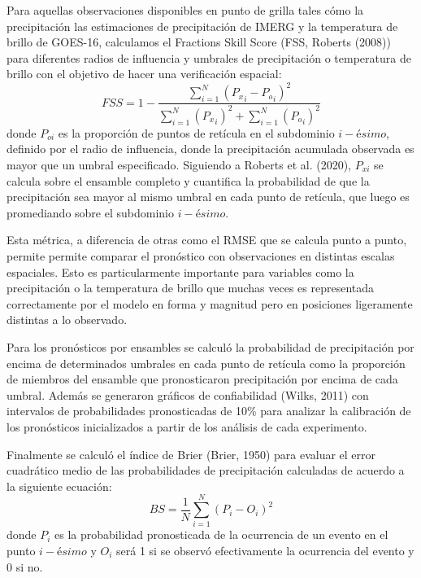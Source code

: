 \documentclass[12pt,oneside,a4paper]{reedthesis}
\begin{document}
Para aquellas observaciones disponibles en punto de grilla tales cómo la precipitación las estimaciones de precipitación de IMERG y la temperatura de brillo de GOES-16, calculamos el Fractions Skill Score (FSS, Roberts (2008)) para diferentes radios de influencia y umbrales de precipitación o temperatura de brillo con el objetivo de hacer una verificación espacial:
\begin{equation}
\mathit{FSS} = 1-\frac{\sum_{i=1}^{N} ({P_x}_i-{P_o}_i)^{2}}{\sum_{i=1}^{N} ({P_x}_i)^{2}+\sum_{i=1}^{N} ({P_o}_i)^{2}}
\label{eq:eq11}
\end{equation}
donde \(P_{oi}\) es la proporción de puntos de retícula en el subdominio \(i-ésimo\), definido por el radio de influencia, donde la precipitación acumulada observada es mayor que un umbral especificado. Siguiendo a Roberts et al. (2020), \(P_{xi}\) se calcula sobre el ensamble completo y cuantifica la probabilidad de que la precipitación sea mayor al mismo umbral en cada punto de retícula, que luego es promediando sobre el subdominio \(i-ésimo\).

Esta métrica, a diferencia de otras como el RMSE que se calcula punto a punto, permite permite comparar el pronóstico con observaciones en distintas escalas espaciales. Esto es particularmente importante para variables como la precipitación o la temperatura de brillo que muchas veces es representada correctamente por el modelo en forma y magnitud pero en posiciones ligeramente distintas a lo observado.

Para los pronósticos por ensambles se calculó la probabilidad de precipitación por encima de determinados umbrales en cada punto de retícula como la proporción de miembros del ensamble que pronosticaron precipitación por encima de cada umbral. Además se generaron gráficos de confiabilidad (Wilks, 2011) con intervalos de probabilidades pronosticadas de 10\% para analizar la calibración de los pronósticos inicializados a partir de los análisis de cada experimento.

Finalmente se calculó el índice de Brier (Brier, 1950) para evaluar el error cuadrático medio de las probabilidades de precipitación calculadas de acuerdo a la siguiente ecuación:
\begin{equation}
\mathit{BS} = \frac{1}{N}\sum_{i=1}^{N} ({P_i}-{O_i})^{2}
\label{eq:eq13}
\end{equation}
donde \(P_i\) es la probabilidad pronosticada de la ocurrencia de un evento en el punto \(i-ésimo\) y \(O_i\) será 1 si se observó efectivamente la ocurrencia del evento y 0 si no.
\end{document}
